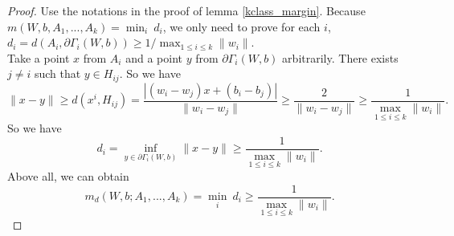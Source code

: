 \begin{proof}
	Use the notations in the proof of lemma \ref{kclass_margin}. Because $m(W,b, A_1,...,A_k) =  \min_{i}~d_i$, we only need to prove for each $i$, $d_i = d(A_i,\partial\Gamma_i(W,b)) \geq 1/\max_{1\leq i\leq k}\|w_i\|$.\\
	Take a point $x$ from $A_i$ and a point $y$ from $\partial\Gamma_i(W,b)$ arbitrarily. There exists $j\neq i$ such that
	$y \in H_{ij}$. So we have
	\begin{equation}
	\|x-y\| \geq d(x^i,H_{ij}) = \frac{|(w_i-w_j)x+(b_i-b_j)|}{\|w_i-w_j\|}\geq \frac{2}{\|w_i-w_j\|}\geq
	\frac{1}{\max_{1\leq i\leq k}\|w_i\|}.
	\end{equation}
    So we have
	\begin{equation}
	d_i = \inf_{y\in \partial\Gamma_i(W,b)} \|x-y\| \geq \frac{1}{\max_{1\leq i\leq k}\|w_i\|}.
	\end{equation}
	Above all, we can obtain
	\begin{equation}
	m_d(W,b;A_1,...,A_k) = \min_i~d_i \geq  \frac{1}{\max_{1\leq i\leq k}\|w_i\|}.
	\end{equation}
	
\end{proof}

